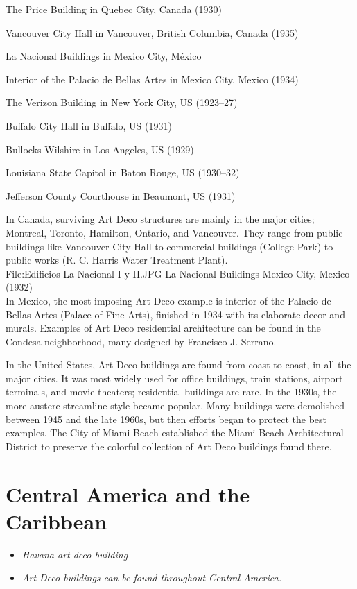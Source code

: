 The Price Building in Quebec City, Canada (1930)

Vancouver City Hall in Vancouver, British Columbia, Canada (1935)

La Nacional Buildings in Mexico City, México

Interior of the Palacio de Bellas Artes in Mexico City, Mexico (1934)

The Verizon Building in New York City, US (1923--27)

Buffalo City Hall in Buffalo, US (1931)

Bullocks Wilshire in Los Angeles, US (1929)

Louisiana State Capitol in Baton Rouge, US (1930--32)

Jefferson County Courthouse in Beaumont, US (1931)

In Canada, surviving Art Deco structures are mainly in the major cities;
Montreal, Toronto, Hamilton, Ontario, and Vancouver. They range from
public buildings like Vancouver City Hall to commercial buildings
(College Park) to public works (R. C. Harris Water Treatment Plant).\\
File:Edificios La Nacional I y II.JPG \textbar{} La Nacional Buildings
Mexico City, Mexico (1932)\\
In Mexico, the most imposing Art Deco example is interior of the Palacio
de Bellas Artes (Palace of Fine Arts), finished in 1934 with its
elaborate decor and murals. Examples of Art Deco residential
architecture can be found in the Condesa neighborhood, many designed by
Francisco J. Serrano.

In the United States, Art Deco buildings are found from coast to coast,
in all the major cities. It was most widely used for office buildings,
train stations, airport terminals, and movie theaters; residential
buildings are rare. In the 1930s, the more austere streamline style
became popular. Many buildings were demolished between 1945 and the late
1960s, but then efforts began to protect the best examples. The City of
Miami Beach established the Miami Beach Architectural District to
preserve the colorful collection of Art Deco buildings found there.

\section{Central America and the
Caribbean}\label{central-america-and-the-caribbean}

\begin{itemize}
\item
  \emph{Havana art deco building}
\item
  \emph{Art Deco buildings can be found throughout Central America.}
\end{itemize}

